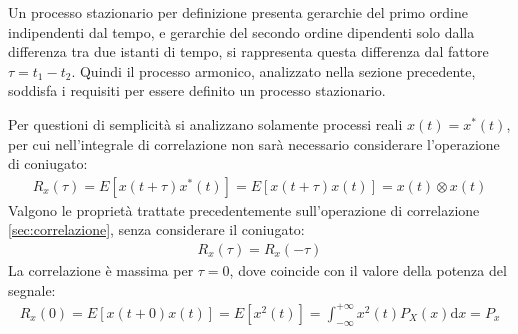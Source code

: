 \documentclass{article}
\newcommand{\df}{\mathrm{d}}
\newcommand{\intinf}{\displaystyle\int_{-\infty}^{+\infty}}
\numberwithin{equation}{subsection}
\begin{document}
Un processo stazionario per definizione presenta gerarchie del primo ordine indipendenti dal tempo, e gerarchie del secondo ordine dipendenti solo dalla differenza tra due 
istanti di tempo, si rappresenta questa differenza dal fattore $\tau=t_1-t_2$. Quindi il processo armonico, analizzato nella sezione precedente, soddisfa i requisiti per essere definito un processo stazionario. 

Per questioni di semplicità si analizzano solamente processi reali $x(t)=x^*(t)$, per cui nell'integrale di correlazione non sarà necessario considerare l'operazione di coniugato:
\begin{gather*}
    R_x(\tau)=E[x(t+\tau)x^*(t)]=E[x(t+\tau)x(t)]=x(t)\otimes x(t)
\end{gather*}
Valgono le proprietà trattate precedentemente sull'operazione di correlazione \ref{sec:correlazione}, senza considerare il coniugato:
\begin{gather*}
    R_x(\tau)=R_x(-\tau)
\end{gather*} 
La correlazione è massima per $\tau=0$, dove coincide con il valore della potenza del segnale:
\begin{gather}
    R_x(0)=E[x(t+0)x(t)]=E[x^2(t)]=\intinf x^2(t)P_X(x)\df x=P_x
\end{gather}
\end{document}
